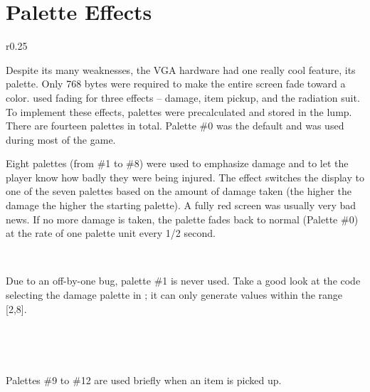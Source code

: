 \section{Palette Effects}
\label{label_palettes} \label{doom_palette}
\begin{wrapfigure}[8]{r}{0.25\textwidth}
\centering
{}
\end{wrapfigure}

Despite its many weaknesses, the VGA hardware had one really cool feature, its palette. Only 768 bytes were required to make the entire screen fade toward a color. \doom{} used fading for three effects -- damage, item pickup, and the radiation suit. To implement these effects, palettes were precalculated and stored in the  lump. There are fourteen palettes in total. Palette \#0 was the default and was used during most of the game.\\
\par
Eight palettes (from \#1 to \#8) were used to emphasize damage and to let the player know how badly they were being injured. The effect switches the display to one of the seven palettes based on the amount of damage taken (the higher the damage the higher the starting palette). A fully red screen was usually very bad news. If no more damage is taken, the palette fades back to normal (Palette \#0) at the rate of one palette unit every 1/2 second.\\
\par
{}
\\
\par
Due to an off-by-one bug, palette \#1 is never used. Take a good look at the code selecting the damage palette in ; it can only generate values within the range [2,8].\\
\par
{}\\
\par
{}\\
\par
Palettes \#9 to \#12 are used briefly when an item is picked up.\\
\par
{}
